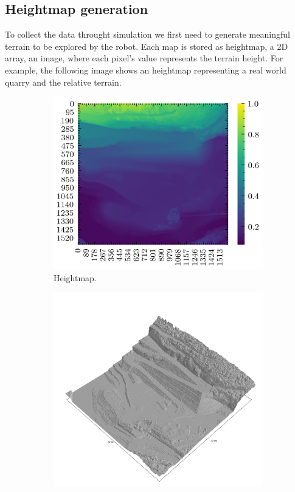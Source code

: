 \documentclass[../document.tex]{subfiles}
\begin{document}
\subsection{Heightmap generation}
\label{subsec: heightmap-generation}
To collect the data throught simulation we first need to generate meaningful terrain to be explored by the robot. Each map is stored as heightmap, a 2D array, an image, where each pixel's value represents the terrain height. For example, the following image shows an heightmap representing a real world quarry and the relative terrain.
\begin{figure}[htbp]
    \centering
        \begin{subfigure}[b]{0.45\textwidth}
            \includegraphics[width=\textwidth]{../img/hm/querry-big-10.png}
            \caption{Heightmap.}
        \end{subfigure}
        \begin{subfigure}[b]{0.45\linewidth}
            \includegraphics[width=\textwidth]{../img/hm3d_borders/querry-big-10.png}

\end{subfigure}
\end{figure}
\end{document}
